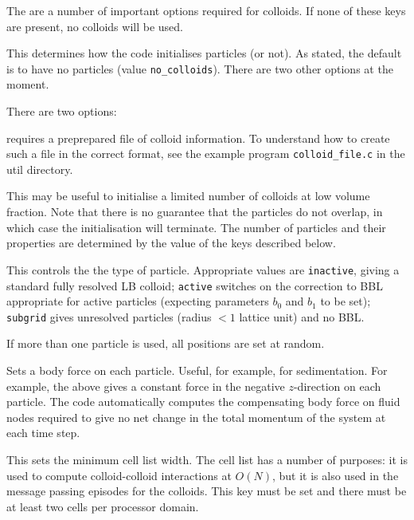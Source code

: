 The are a number of important options required for colloids. If
none of these keys are present, no colloids will be used.


This determines how the code initialises particles (or not). As stated, the
default is to have no particles (value \texttt{no\_colloids}). There
are two other options at the moment.

There are two options:


requires a preprepared file of colloid information. To understand
how to create such a file in the correct format,
see the example program \texttt{colloid\_file.c} in the util
directory.


This may be useful to initialise a limited number of colloids at
low volume fraction. Note that there is no guarantee that the
particles do not overlap, in which case the initialisation will
terminate. The number of particles and their properties
are determined by the value of the keys described below.


This controls the the type of particle. Appropriate values are
\texttt{inactive}, giving a standard fully resolved LB colloid;
\texttt{active} switches on the correction to BBL appropriate
for active particles (expecting parameters $b_0$ and $b_1$ to be
set); \texttt{subgrid} gives unresolved particles (radius $< 1$
lattice unit) and no BBL.

If more than one particle is used, all positions are set at random.



Sets a body force on each particle. Useful, for example, for
sedimentation. For example, the above gives a constant force in
the negative $z$-direction on each particle.
The code automatically computes the compensating body force on fluid
nodes required to give no net change in the total momentum of the
system at each time step.


This sets the minimum cell list width. The cell list has a number
of purposes: it is used to compute colloid-colloid interactions
at $O(N)$, but it is also used in the message passing episodes
for the colloids. This key must be set and there must be at least
two cells per processor domain.



